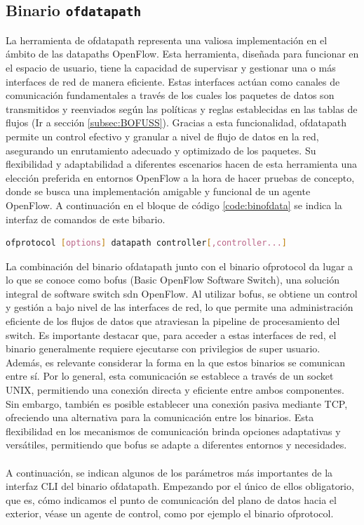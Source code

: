 \subsection{Binario \texttt{ofdatapath}}


La herramienta de ofdatapath representa una valiosa implementación en el ámbito de las datapaths OpenFlow. Esta herramienta, diseñada para funcionar en el espacio de usuario, tiene la capacidad de supervisar y gestionar una o más interfaces de red de manera eficiente. Estas interfaces actúan como canales de comunicación fundamentales a través de los cuales los paquetes de datos son transmitidos y reenviados según las políticas y reglas establecidas en las tablas de flujos (Ir a sección \ref{subsec:BOFUSS}). Gracias a esta funcionalidad, ofdatapath permite un control efectivo y granular a nivel de flujo de datos en la red, asegurando un enrutamiento adecuado y optimizado de los paquetes. Su flexibilidad y adaptabilidad a diferentes escenarios hacen de esta herramienta una elección preferida en entornos OpenFlow a la hora de hacer pruebas de concepto, donde se busca una implementación amigable y funcional de un agente OpenFlow. A continuación en el bloque de código \ref{code:binofdata} se indica la interfaz de comandos de este bibario.\\

\begin{lstlisting}[language= bash, style=Consola, caption={Interfaz CLI del binario ofdatapath},label=code:binofdata]
    ofprotocol [options] datapath controller[,controller...]
\end{lstlisting}
\vspace{0.5cm}

La combinación del binario ofdatapath junto con el binario ofprotocol da lugar a lo que se conoce como \gls{bofus} (Basic OpenFlow Software Switch), una solución integral de software switch \gls{sdn} OpenFlow. Al utilizar \gls{bofus}, se obtiene un control y gestión a bajo nivel de las interfaces de red, lo que permite una administración eficiente de los flujos de datos que atraviesan la pipeline de procesamiento del switch. Es importante destacar que, para acceder a estas interfaces de red, el binario generalmente requiere ejecutarse con privilegios de super usuario. Además, es relevante considerar la forma en la que estos binarios se comunican entre sí. Por lo general, esta comunicación se establece a través de un socket UNIX, permitiendo una conexión directa y eficiente entre ambos componentes. Sin embargo, también es posible establecer una conexión pasiva mediante TCP, ofreciendo una alternativa para la comunicación entre los binarios. Esta flexibilidad en los mecanismos de comunicación brinda opciones adaptativas y versátiles, permitiendo que \gls{bofus} se adapte a diferentes entornos y necesidades. \\
\\
A continuación, se indican algunos de los parámetros más importantes de la interfaz CLI del binario ofdatapath. Empezando por el único de ellos obligatorio, que es, cómo indicamos el punto de comunicación del plano de datos hacia el exterior, véase un agente de control, como por ejemplo el binario ofprotocol.\\

